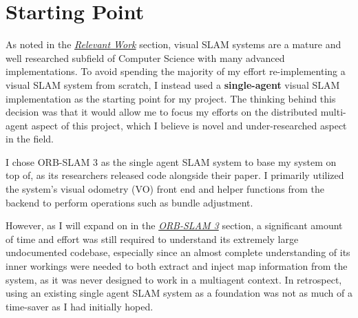 




\label{sec:2}

\section{Starting Point}
\label{sec:starting-point}
As noted in the \hyperref[sec:relevant-work]{\textit{Relevant Work}} section, visual SLAM systems are a mature and well researched subfield of Computer Science with many advanced implementations. To avoid spending the majority of my effort re-implementing a visual SLAM system from scratch, I instead used a \textbf{single-agent} visual SLAM implementation as the starting point for my project. The thinking behind this decision was that it would allow me to focus my efforts on the distributed multi-agent aspect of this project, which I believe is novel and under-researched aspect in the field.

I chose ORB-SLAM 3 as the single agent SLAM system to base my system on top of, as its researchers released code alongside their paper. I primarily utilized the system's visual odometry (VO) front end and helper functions from the backend to perform operations such as bundle adjustment.

However, as I will expand on in the \hyperref[sec:orb-slam-3]{\textit{ORB-SLAM 3}} section, a significant amount of time and effort was still required to understand its extremely large undocumented codebase, especially since an almost complete understanding of its inner workings were needed to both extract and inject map information from the system, as it was never designed to work in a multiagent context. In retrospect, using an existing single agent SLAM system as a foundation was not as much of a time-saver as I had initially hoped.

